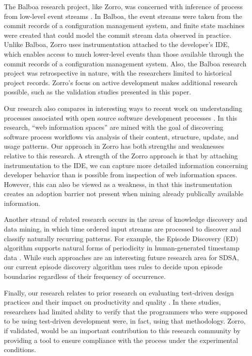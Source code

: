 \documentclass[runningheads]{llncs}
\begin{document}
The Balboa research project, like Zorro, was concerned with inference of
process from low-level event streams \cite{Cook:95}. In Balboa, the event
streams were taken from the commit records of a configuration management
system, and finite state machines were created that could model the commit
stream data observed in practice. Unlike Balboa, Zorro uses instrumentation
attached to the developer's IDE, which enables access to much lower-level
events than those available through the commit records of a configuration
management system. Also, the Balboa research project was retrospective in
nature, with the researchers limited to historical project records.
Zorro's focus on active development makes additional research possible,
such as the validation studies presented in this paper.

Our research also compares in interesting ways to recent work on
understanding processes associated with open source software development
processes \cite{Jensen:05}. In this research, ``web information spaces''
are mined with the goal of discovering software process workflows via
analysis of their content, structure, update, and usage patterns. Our
approach in Zorro has both strengths and weaknesses relative to this
research.  A strength of the Zorro approach is that by attaching
instrumentation to the IDE, we can capture more detailed information
concerning developer behavior than is possible from inspection of web
information spaces. However, this can also be viewed as a weakness, in that
this instrumentation creates an adoption barrier not present when mining
already publically available information.

Another strand of related research occurs in the areas of knowledge
discovery and data mining, in which time ordered input streams are
processed to discover and classify naturally recurring patterns.  For
example, the Episode Discovery (ED) algorithm supports natural forms of
periodicity in human-generated timestamp data \cite{Heierman04}.  While
such approaches are an interesting future research area for SDSA, our
current episode discovery algorithm uses rules to decide upon episode
boundaries regardless of their frequency of occurrence.

Finally, our research relates to prior research on evaluating test-driven
design practices and their impact on productivity and quality
\cite{George:04,Muller:02,Olan:03,Edwards:04,Geras:04,Matjaz:03}.  In these
studies, researchers had limited ability to verify that the programmers who
were supposed to be using test-driven development were, in fact, using that
methodology.  Zorro, if validated, would be an important contribution to
this research community by providing a tool to ensure compliance with the
process under the experimental conditions.
\end{document}
